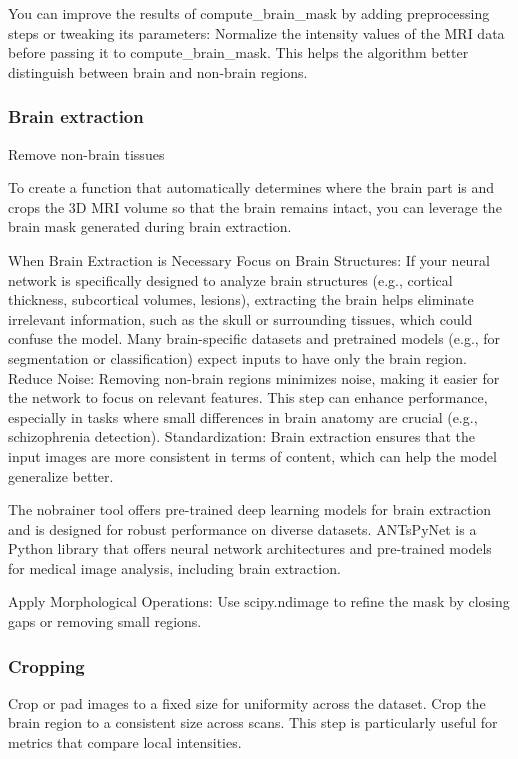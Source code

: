 You can improve the results of compute_brain_mask by adding preprocessing steps or tweaking its parameters:
Normalize the intensity values of the MRI data before passing it to compute_brain_mask.
This helps the algorithm better distinguish between brain and non-brain regions.

\subsubsection{Brain extraction}

Remove non-brain tissues 

To create a function that automatically determines where the brain part is and crops the 3D MRI volume so that the brain remains intact, you can leverage the brain mask generated during brain extraction. 

When Brain Extraction is Necessary
Focus on Brain Structures:
If your neural network is specifically designed to analyze brain structures (e.g., cortical thickness, subcortical volumes, lesions), extracting the brain helps eliminate irrelevant information, such as the skull or surrounding tissues, which could confuse the model.
Many brain-specific datasets and pretrained models (e.g., for segmentation or classification) expect inputs to have only the brain region.
Reduce Noise:
Removing non-brain regions minimizes noise, making it easier for the network to focus on relevant features.
This step can enhance performance, especially in tasks where small differences in brain anatomy are crucial (e.g., schizophrenia detection).
Standardization:
Brain extraction ensures that the input images are more consistent in terms of content, which can help the model generalize better.


The nobrainer tool offers pre-trained deep learning models for brain extraction and is designed for robust performance on diverse datasets.
ANTsPyNet is a Python library that offers neural network architectures and pre-trained models for medical image analysis, including brain extraction.

Apply Morphological Operations:
Use scipy.ndimage to refine the mask by closing gaps or removing small regions.

\subsubsection{Cropping}

Crop or pad images to a fixed size for uniformity across the dataset.
Crop the brain region to a consistent size across scans. This step is particularly useful for metrics that compare local intensities.

